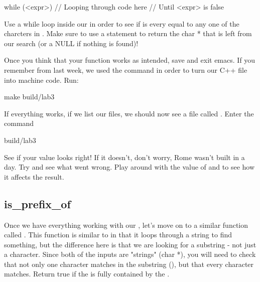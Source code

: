 \documentclass{tufte-handout}
\begin{document}
\begin{Code}
    while (<expr>) {
        // Looping through code here
        // Until <expr> is false
    }
\end{Code}

Use a while loop inside our  in order to see if  is every equal to any one of the charcters in .
Make sure to use a  statement to return the char * that is left from our search (or a NULL if nothing is found)!

Once you think that your function works as intended, save and exit emacs. If you remember from last week, we used the  command in order to turn our C++ file into machine code. Run:
\begin{CmdLine}
  \prompt make build/lab3
\end{CmdLine}
If everything works, if we list our files, we should now see a file called .  Enter the command
\begin{CmdLine}
  \prompt build/lab3
\end{CmdLine}
See if your value looks right!  If it doesn't, don't worry, Rome wasn't built in a day. Try and see what went wrong.  Play around with the value of  and  to see how it affects the result.

\subsection{is_prefix_of}

Once we have everything working with our , let's move on to a similar function called . This function is similar to  in that it loops through a string to find something, but the difference here is that we are looking for a substring - not just a character. Since both of the inputs are "strings" (char *), you will need to check that not only one character matches in the substring (), but that every character matches. Return true if the  is fully contained by the .
\end{document}
